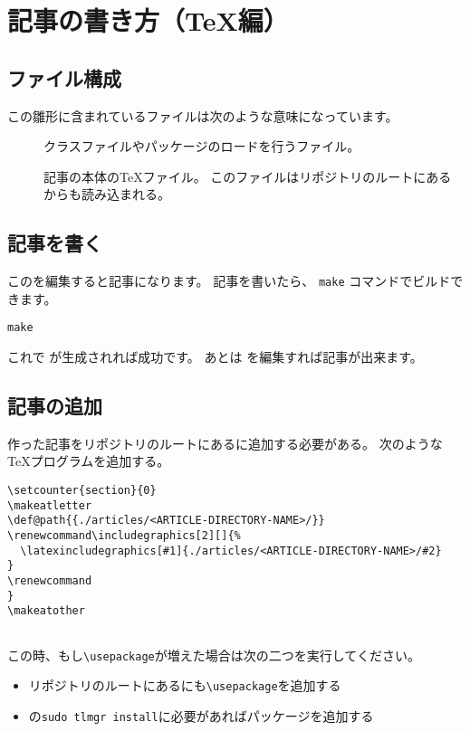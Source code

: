 \subtitle{ヘッダの見出し}
\author{ほげ}

\chapter{記事の書き方（\TeX 編）}

\section{ファイル構成}

この雛形に含まれているファイルは次のような意味になっています。

\begin{description}
  \item[]
    クラスファイルやパッケージのロードを行うファイル。
  \item[]
    記事の本体の\TeX ファイル。
    このファイルはリポジトリのルートにあるからも読み込まれる。
\end{description}

\section{記事を書く}

このを編集すると記事になります。
記事を書いたら、 \lstinline|make| コマンドでビルドできます。

\begin{lstlisting}
make
\end{lstlisting}

これで が生成されれば成功です。
あとは を編集すれば記事が出来ます。

\section{記事の追加}

作った記事をリポジトリのルートにあるに追加する必要がある。
次のような\TeX プログラムを追加する。

\begin{lstlisting}
\setcounter{section}{0}
\makeatletter
\def@path{{./articles/<ARTICLE-DIRECTORY-NAME>/}}
\renewcommand\includegraphics[2][]{%
  \latexincludegraphics[#1]{./articles/<ARTICLE-DIRECTORY-NAME>/#2}
}
\renewcommand
}
\makeatother


\end{lstlisting}

この時、もし\lstinline|\usepackage|が増えた場合は次の二つを実行してください。

\begin{itemize}
  \item リポジトリのルートにあるにも\lstinline|\usepackage|を追加する
  \item {}の\lstinline|sudo tlmgr install|に必要があればパッケージを追加する
\end{itemize}
